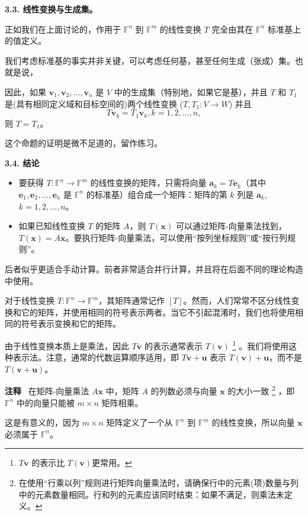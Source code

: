 \textbf{3.3. 线性变换与生成集。}

正如我们在上面讨论的，作用于 $\mathbb{F}^n$ 到 $\mathbb{F}^m$ 的线性变换 $T$ 完全由其在 $\mathbb{F}^n$ 标准基上的值定义。

我们考虑标准基的事实并非关键，可以考虑任何基，甚至任何生成（张成）集。也就是说，

因此，如果 $\mathbf{v}_1, \mathbf{v}_2, \dots, \mathbf{v}_n$ 是 $V$ 中的生成集（特别地，如果它是基），并且 $T$ 和 $T_1$ 是(具有相同定义域和目标空间的)两个线性变换 ($T, T_1: V \to W$) 并且 $$T \mathbf{v}_k = T_1 \mathbf{v}_k, k = 1, 2, \dots, n,$$ 
则 $T = T_1$。

这个命题的证明是微不足道的，留作练习。

\textbf{3.4. 结论}
\begin{itemize}
\item 要获得 $T: \mathbb{F}^n \to \mathbb{F}^m$ 的线性变换的矩阵，只需将向量 $\mathbf{a}_k = T \mathbf{e}_k$（其中 $\mathbf{e}_1, \mathbf{e}_2, \dots, \mathbf{e}_n$ 是 $\mathbb{F}^n$ 的标准基）组合成一个矩阵：矩阵的第 $k$ 列是 $\mathbf{a}_k$, $k = 1, 2, \dots, n$。
\item 如果已知线性变换 $T$ 的矩阵 $A$，则 $T(\mathbf{x})$ 可以通过矩阵-向量乘法找到，$T(\mathbf{x}) = A \mathbf{x}$。要执行矩阵-向量乘法，可以使用“按列坐标规则”或“按行列规则”。
\end{itemize}
后者似乎更适合手动计算。前者非常适合并行计算，并且将在后面不同的理论构造中使用。

对于线性变换 $T: \mathbb{F}^n \to \mathbb{F}^m$，其矩阵通常记作 $[T]$。然而，人们常常不区分线性变换和它的矩阵，并使用相同的符号表示两者。当它不引起混淆时，我们也将使用相同的符号表示变换和它的矩阵。

由于线性变换本质上是乘法，因此 $T \mathbf{v}$ 的表示通常表示 $T(\mathbf{v})$
\footnote{
$T \mathbf{v}$ 的表示比 $T(\mathbf{v})$更常用。
}
。我们将使用这种表示法。注意，通常的代数运算顺序适用，即 $T \mathbf{v} + \mathbf{u}$ 表示 $T(\mathbf{v}) + \mathbf{u}$，而不是 $T(\mathbf{v} + \mathbf{u})$。

\textbf{注释}~ 在矩阵-向量乘法 $A \mathbf{x}$ 中，矩阵 $A$ 的列数必须与向量 $\mathbf{x}$ 的大小一致
\footnote{
在使用“行乘以列”规则进行矩阵向量乘法时，请确保行中的元素(项)数量与列中的元素数量相同。行和列的元素应该同时结束：如果不满足，则乘法未定义。
}
，即 $\mathbb{F}^n$ 中的向量只能被 $m \times n$ 矩阵相乘。

这是有意义的，因为 $m \times n$ 矩阵定义了一个从 $\mathbb{F}^n$ 到 $\mathbb{F}^m$ 的线性变换，所以向量 $\mathbf{x}$ 必须属于 $\mathbb{F}^n$。


